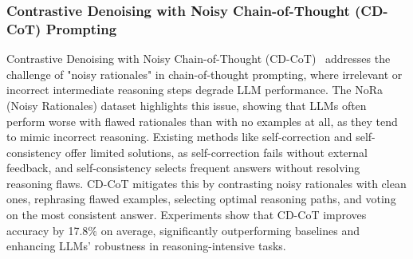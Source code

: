 \documentclass{article}
\begin{document}
\subsubsection{Contrastive Denoising with Noisy Chain-of-Thought (CD-CoT) Prompting}
\label{CD-CoT}
\noindent Contrastive Denoising with Noisy Chain-of-Thought (CD-CoT)~\citep{NEURIPS2024_dfaa29ed} addresses the challenge of "noisy rationales" in chain-of-thought prompting, where irrelevant or incorrect intermediate reasoning steps degrade LLM performance. The NoRa (Noisy Rationales) dataset highlights this issue, showing that LLMs often perform worse with flawed rationales than with no examples at all, as they tend to mimic incorrect reasoning. Existing methods like self-correction and self-consistency offer limited solutions, as self-correction fails without external feedback, and self-consistency selects frequent answers without resolving reasoning flaws. CD-CoT mitigates this by contrasting noisy rationales with clean ones, rephrasing flawed examples, selecting optimal reasoning paths, and voting on the most consistent answer. Experiments show that CD-CoT improves accuracy by 17.8\% on average, significantly outperforming baselines and enhancing LLMs’ robustness in reasoning-intensive tasks.
\end{document}
